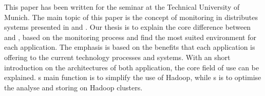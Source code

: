 
This paper has been written for the seminar \isdslong at the Technical University of Munich. The main topic of this paper is the concept of monitoring in distributes systems presented in \ambshort and \chukshort. Our thesis is to explain the core difference between \ambshort and \chukshort, based on the monitoring process and find the most suited environment for each application. The emphasis is based on the benefits that each application is offering to the current technology processes and systems. With an short introduction on the architectures of both application, the core field of use can be explained. \ambshort s main function is to simplify the use of Hadoop, while \chukshort s is to optimise the analyse and storing on Hadoop clusters. 